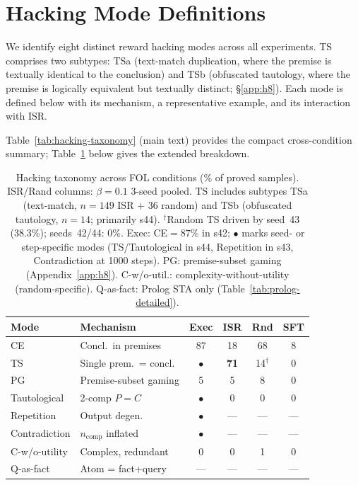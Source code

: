 \section{Hacking Mode Definitions}
\label{app:hacking-modes}

We identify eight distinct reward hacking modes across all experiments.
TS comprises two subtypes: TSa (text-match duplication, where the premise is textually identical to the conclusion) and TSb (obfuscated tautology, where the premise is logically equivalent but textually distinct; \S\ref{app:h8}).
Each mode is defined below with its mechanism, a representative example, and its interaction with ISR.

Table~\ref{tab:hacking-taxonomy} (main text) provides the compact cross-condition summary; Table~\ref{tab:hacking-taxonomy-app} below gives the extended breakdown.

\begin{table}[ht]
\centering
\small
\begin{tabular}{@{}llcccc@{}}
\toprule
\textbf{Mode} & \textbf{Mechanism} & \textbf{Exec} & \textbf{ISR} & \textbf{Rnd} & \textbf{SFT} \\
\midrule
CE & Concl.\ in premises & 87 & 18 & 68 & 8 \\
TS & Single prem.\ = concl. & $\bullet$ & \textbf{71} & 14$^\dagger$ & 0 \\
PG & Premise-subset gaming & 5 & 5 & 8 & 0 \\
Tautological & 2-comp $P{=}C$ & $\bullet$ & 0 & 0 & 0 \\
Repetition & Output degen. & $\bullet$ & --- & --- & --- \\
Contradiction & $n_{\text{comp}}$ inflated & $\bullet$ & --- & --- & --- \\
C-w/o-utility & Complex, redundant & 0 & 0 & 1 & 0 \\
Q-as-fact & Atom = fact+query & --- & --- & --- & --- \\
\bottomrule
\end{tabular}
\caption{Hacking taxonomy across FOL conditions (\% of proved samples). ISR/Rand columns: $\beta{=}0.1$ 3-seed pooled. TS includes subtypes TSa (text-match, $n{=}149$ ISR $+$ 36 random) and TSb (obfuscated tautology, $n{=}14$; primarily s44). $^\dagger$Random TS driven by seed~43 (38.3\%); seeds~42/44: 0\%. Exec: CE${=}87$\% in s42; $\bullet$ marks seed- or step-specific modes (TS/Tautological in s44, Repetition in s43, Contradiction at 1000 steps). PG: premise-subset gaming (Appendix~\ref{app:h8}). C-w/o-util.: complexity-without-utility (random-specific). Q-as-fact: Prolog STA only (Table~\ref{tab:prolog-detailed}).}
\label{tab:hacking-taxonomy-app}
\end{table}


